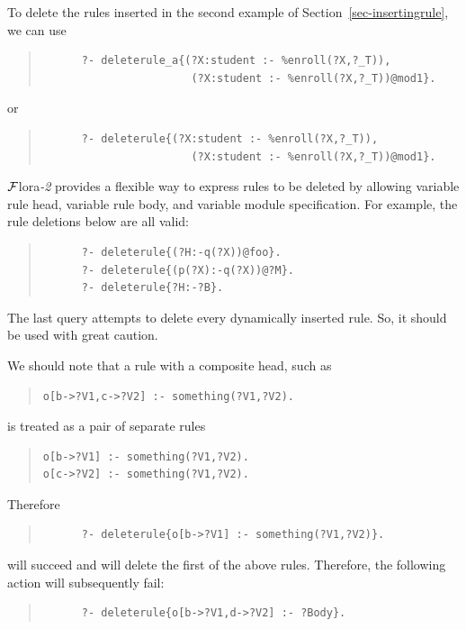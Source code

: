 \documentclass[11pt]{article}
\newcommand{\FLORA}{{\mbox{\sc ${\cal F}${lora}\rm\emph{-2}}}\xspace}
\newcommand{\FLSYSTEM}{\FLORA}
\begin{document}
To delete the rules inserted in the second example of
Section~\ref{sec-insertingrule}, we can use
\begin{quote}
\begin{verbatim}
      ?- deleterule_a{(?X:student :- %enroll(?X,?_T)),
                       (?X:student :- %enroll(?X,?_T))@mod1}.
\end{verbatim}
\end{quote}
or
\begin{quote}
\begin{verbatim}
      ?- deleterule{(?X:student :- %enroll(?X,?_T)),
                       (?X:student :- %enroll(?X,?_T))@mod1}.
\end{verbatim}
\end{quote}

\FLSYSTEM provides a flexible way to express rules to be deleted by
allowing variable rule head, variable rule body, and variable module
specification. For example, the rule deletions below are all valid:
\begin{quote}
\begin{verbatim}
      ?- deleterule{(?H:-q(?X))@foo}.
      ?- deleterule{(p(?X):-q(?X))@?M}.
      ?- deleterule{?H:-?B}.
\end{verbatim}
\end{quote}
The last query attempts to delete every dynamically inserted rule. So, it
should be used with great caution.

We should note that a rule with a composite head, such as 
\begin{quote}
   \begin{verbatim}
o[b->?V1,c->?V2] :- something(?V1,?V2).     
   \end{verbatim}
\end{quote}
is treated as a pair of separate rules
\begin{quote}
\begin{verbatim}
o[b->?V1] :- something(?V1,?V2).     
o[c->?V2] :- something(?V1,?V2).     
\end{verbatim}
\end{quote}
Therefore
\begin{quote}
\begin{verbatim}
      ?- deleterule{o[b->?V1] :- something(?V1,?V2)}.
\end{verbatim}
\end{quote}
will succeed and will delete the first of the above rules.
Therefore, the following action will subsequently fail:
\begin{quote}
\begin{verbatim}
      ?- deleterule{o[b->?V1,d->?V2] :- ?Body}.
\end{verbatim}
\end{quote}
\end{document}
